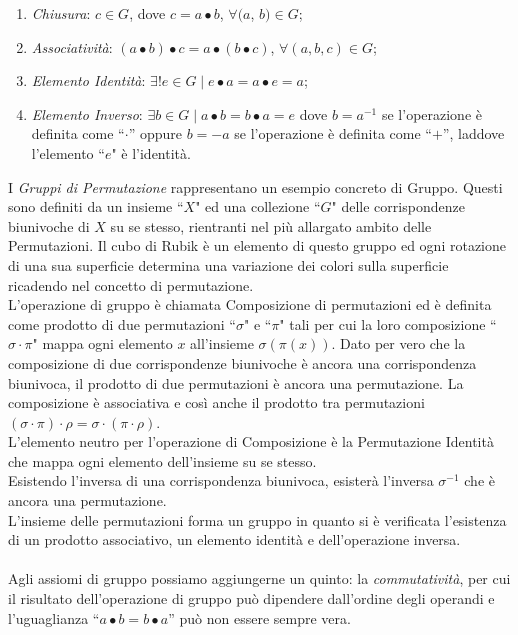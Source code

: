 \documentclass[a4paper,12pt]{tesiinfo}
\begin{document}
\begin{enumerate}
  \item \textit{Chiusura}: $ c \in G$, dove $c = a\bullet b$, $ \forall (a$, $b) \in G$;
  \item \textit{Associativit\`a}: $\left ( a\bullet b \right ) \bullet c = a \bullet \left ( b \bullet c \right ) $, $ \forall (a, b, c) \in G$;
  \item \textit{Elemento Identit\`a}: $ \exists ! e \in G \mid e \bullet a = a \bullet e = a$;
  \item \textit{Elemento Inverso}: $\exists b \in G \mid a \bullet b = b \bullet a = e$ dove $b = a^{-1} $ se l'operazione \`e definita come ``$\cdot$'' oppure $b = -a $ se l'operazione \`e definita come ``$+$'', laddove l'elemento ``$e$" \`e l'identit\`a.
\end{enumerate} 
I \textit{Gruppi di Permutazione} rappresentano un esempio concreto di Gruppo. Questi sono definiti da un insieme ``$X$" ed una collezione ``$G$" delle corrispondenze biunivoche di $X$ su se stesso, rientranti nel pi\`u allargato ambito delle Permutazioni. Il cubo di Rubik \`e un elemento di questo gruppo ed ogni rotazione di una sua superficie determina una variazione dei colori sulla superficie ricadendo nel concetto di permutazione.
\\
L'operazione di gruppo \`e chiamata Composizione di permutazioni ed \`e definita come prodotto di due permutazioni ``$\sigma$" e ``$\pi$" tali per cui la loro composizione ``$\sigma \cdot \pi$" mappa ogni elemento $x$ all'insieme $\sigma ( \pi ( x ) )$. Dato per vero che la composizione di due corrispondenze biunivoche \`e ancora una corrispondenza biunivoca, il prodotto di due permutazioni \`e ancora una permutazione. La composizione \`e associativa e cos\`i anche il prodotto tra permutazioni $ (\sigma \cdot \pi) \cdot \rho = \sigma \cdot ( \pi \cdot \rho )$.
\\
L'elemento neutro per l'operazione di Composizione \`e la Permutazione Identit\`a che mappa ogni elemento dell'insieme su se stesso. 
\\
Esistendo l'inversa di una corrispondenza biunivoca, esister\`a l'inversa $ \sigma ^ {-1} $ che \`e ancora una permutazione.
\\
L'insieme delle permutazioni forma un gruppo in quanto si \`e verificata l'esistenza di un prodotto associativo, un elemento identit\`a e dell'operazione inversa.
%
%
%
\\\\
Agli assiomi di gruppo possiamo aggiungerne un quinto: la \textit{commutativit\`a}, per cui il risultato dell'operazione di gruppo pu\`o dipendere dall'ordine degli operandi e l'uguaglianza ``$ a \bullet b = b \bullet a$'' pu\`o non essere sempre vera. 
\end{document}
